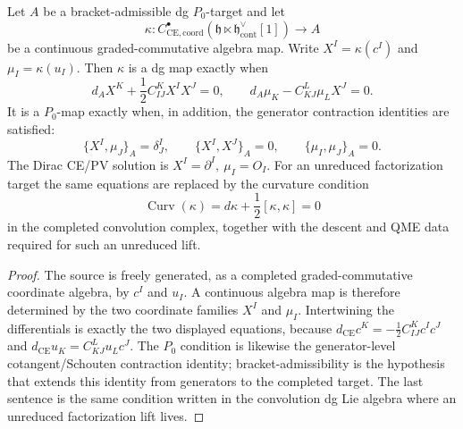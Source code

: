 \documentclass[11pt]{memoir}
\begin{document}
\begin{prop}\label{prop:coordinate-coupling-equations}
  Let \(A\) be a bracket-admissible dg \(P_0\)-target and let
  \[
    \kappa\colon
    C^\bullet_{\mathrm{CE},\mathrm{coord}}
    (\mathfrak h\ltimes\mathfrak h^\vee_{\mathrm{cont}}[1])
    \longrightarrow A
  \]
  be a continuous graded-commutative algebra map.  Write
  \(X^I=\kappa(c^I)\) and \(\mu_I=\kappa(u_I)\).  Then \(\kappa\) is a dg
  map exactly when
  \[
    d_A X^K+\frac12 C^K_{IJ}X^IX^J=0,\qquad
    d_A\mu_K-C^L_{KJ}\mu_LX^J=0 .
  \]
  It is a \(P_0\)-map exactly when, in addition, the generator
  contraction identities are satisfied:
  \[
    \{X^I,\mu_J\}_A=\delta^I_J,\qquad
    \{X^I,X^J\}_A=0,\qquad
    \{\mu_I,\mu_J\}_A=0 .
  \]
  The Dirac CE/PV solution is
  \(X^I=\partial^I,\ \mu_I=O_I\).  For an unreduced factorization target the
  same equations are replaced by the curvature condition
  \[
    \operatorname{Curv}(\kappa)
    =d\kappa+\frac12[\kappa,\kappa]=0
  \]
  in the completed convolution complex, together with the descent and
  QME data required for such an unreduced lift.
\end{prop}

\begin{proof}
  The source is freely generated, as a completed graded-commutative
  coordinate algebra, by \(c^I\) and \(u_I\).  A continuous algebra map is
  therefore determined by the two coordinate families \(X^I\) and
  \(\mu_I\).  Intertwining the differentials is exactly the two displayed
  equations, because
  \(d_{\mathrm{CE}}c^K=-\frac12C^K_{IJ}c^Ic^J\) and
  \(d_{\mathrm{CE}}u_K=C^L_{KJ}u_Lc^J\).  The \(P_0\) condition is
  likewise the generator-level cotangent/Schouten contraction identity;
  bracket-admissibility is the hypothesis that extends this identity from
	  generators to the completed target.  The last sentence is the same
	  condition written in the convolution dg Lie algebra where an unreduced
	  factorization lift lives.
\end{proof}
\end{document}
